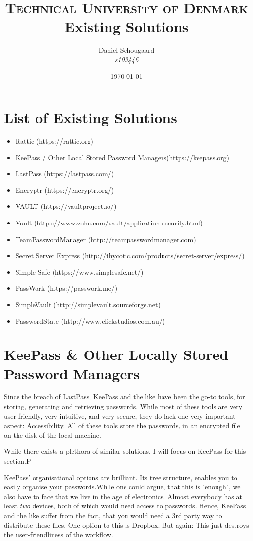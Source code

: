 \documentclass[a4paper,10pt]{article}
\title{	
\textsc{Technical University of Denmark} \\ [25pt] 
\huge Existing Solutions
}
\author{Daniel Schougaard \\ \textit{s103446}}
\date{\normalsize\today}
\begin{document}
\maketitle 


\section{List of Existing Solutions}
	\begin{itemize}
		\item Rattic (https://rattic.org)
		\item KeePass / Other Local Stored Password Managers(https://keepass.org)
		\item LastPass (https://lastpass.com/)
		\item Encryptr (https://encryptr.org/)
		\item VAULT (https://vaultproject.io/)
		\item Vault (https://www.zoho.com/vault/application-security.html)
		\item TeamPasswordManager (http://teampasswordmanager.com)
		\item Secret Server Express (http://thycotic.com/products/secret-server/express/)
		\item Simple Safe (https://www.simplesafe.net/)
		\item PassWork (https://passwork.me/)
		\item SimpleVault (http://simplevault.sourceforge.net)
		\item PasswordState (http://www.clickstudios.com.au/)
	\end{itemize}


\section{KeePass \& Other Locally Stored Password Managers}
	Since the breach of LastPass, KeePass and the like have been the go-to tools, for storing, generating and retrieving passwords. While most of these tools are very user-friendly, very intuitive, and very secure, they do lack one very important aspect: Accessibility. All of these tools store the passwords, in an encrypted file on the disk of the local machine.

	While there exists a plethora of similar solutions, I will focus on KeePass for this section.P

	KeePass' organisational options are brilliant. Its tree structure, enables you to easily organise your passwords.While one could argue, that this is "enough", we also have to face that we live in the age of electronics. Almost everybody has at least \emph{two} devices, both of which would need access to passwords. Hence, KeePass and the like suffer from the fact, that you would need a 3rd party way to distribute these files. One option to this is Dropbox. But again: This just destroys the user-friendliness of the workflow.
\end{document}
